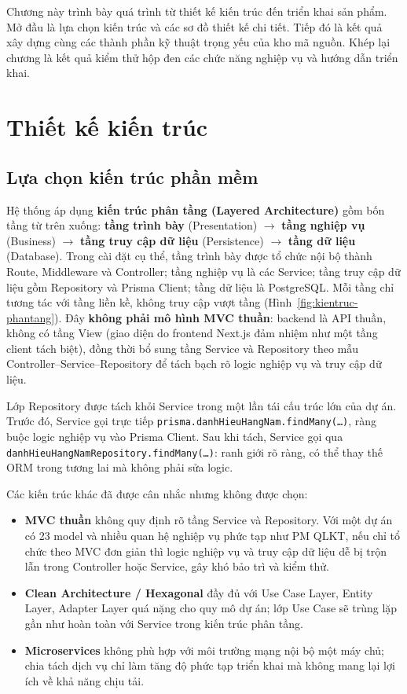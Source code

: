 \documentclass[../DoAn.tex]{subfiles}
\begin{document}
Chương này trình bày quá trình từ thiết kế kiến trúc đến triển khai sản phẩm. Mở đầu là lựa chọn kiến trúc và các sơ đồ thiết kế chi tiết. Tiếp đó là kết quả xây dựng cùng các thành phần kỹ thuật trọng yếu của kho mã nguồn. Khép lại chương là kết quả kiểm thử hộp đen các chức năng nghiệp vụ và hướng dẫn triển khai.

\section{Thiết kế kiến trúc}
\label{section:4.1}

\subsection{Lựa chọn kiến trúc phần mềm}
\label{subsection:4.1.1}

Hệ thống áp dụng \textbf{kiến trúc phân tầng (Layered Architecture)} \cite{fowler2002poeaa,bass2021architecture} gồm bốn tầng từ trên xuống: \textbf{tầng trình bày} (Presentation) $\rightarrow$ \textbf{tầng nghiệp vụ} (Business) $\rightarrow$ \textbf{tầng truy cập dữ liệu} (Persistence) $\rightarrow$ \textbf{tầng dữ liệu} (Database). Trong cài đặt cụ thể, tầng trình bày được tổ chức nội bộ thành Route, Middleware và Controller; tầng nghiệp vụ là các Service; tầng truy cập dữ liệu gồm Repository và Prisma Client; tầng dữ liệu là PostgreSQL. Mỗi tầng chỉ tương tác với tầng liền kề, không truy cập vượt tầng (Hình~\ref{fig:kientruc-phantang}). Đây \textbf{không phải mô hình MVC thuần}: backend là API thuần, không có tầng View (giao diện do frontend Next.js đảm nhiệm như một tầng client tách biệt), đồng thời bổ sung tầng Service và Repository theo mẫu Controller--Service--Repository để tách bạch rõ logic nghiệp vụ và truy cập dữ liệu.

Lớp Repository được tách khỏi Service trong một lần tái cấu trúc lớn của dự án. Trước đó, Service gọi trực tiếp \texttt{prisma.danhHieuHangNam.findMany(\dots)}, ràng buộc logic nghiệp vụ vào Prisma Client. Sau khi tách, Service gọi qua \texttt{danhHieuHangNamRepository.findMany(\dots)}: ranh giới rõ ràng, có thể thay thế ORM trong tương lai mà không phải sửa logic.

Các kiến trúc khác đã được cân nhắc nhưng không được chọn:

\begin{itemize}
    \item \textbf{MVC thuần} không quy định rõ tầng Service và Repository. Với một dự án có 23 model và nhiều quan hệ nghiệp vụ phức tạp như PM QLKT, nếu chỉ tổ chức theo MVC đơn giản thì logic nghiệp vụ và truy cập dữ liệu dễ bị trộn lẫn trong Controller hoặc Service, gây khó bảo trì và kiểm thử.
    \item \textbf{Clean Architecture / Hexagonal} đầy đủ với Use Case Layer, Entity Layer, Adapter Layer quá nặng cho quy mô dự án; lớp Use Case sẽ trùng lặp gần như hoàn toàn với Service trong kiến trúc phân tầng.
    \item \textbf{Microservices} không phù hợp với môi trường mạng nội bộ một máy chủ; chia tách dịch vụ chỉ làm tăng độ phức tạp triển khai mà không mang lại lợi ích về khả năng chịu tải.
\end{itemize}
\end{document}
